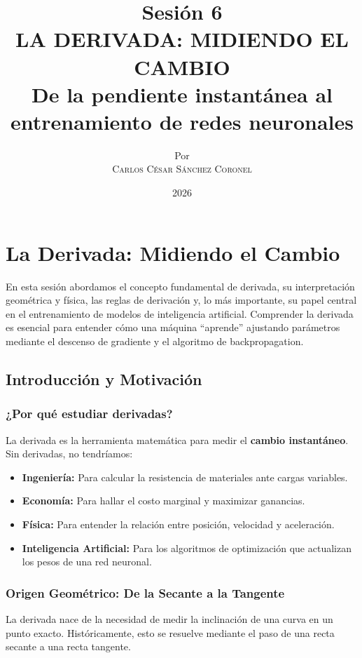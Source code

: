 \documentclass[12pt,a4paper,openany,oneside]{book}
\title{
    \textbf{Sesión 6} \\ 
    \Huge \textbf{LA DERIVADA: MIDIENDO EL CAMBIO} \\
    \large De la pendiente instantánea al entrenamiento de redes neuronales \\

}
\author{
    \small Por \\ \vspace{0.2cm}
    \Large \textsc{Carlos César Sánchez Coronel}
}
\date{2026}
\begin{document}
\maketitle
\tableofcontents
{}

\chapter{La Derivada: Midiendo el Cambio}

En esta sesión abordamos el concepto fundamental de derivada, su interpretación geométrica y física, las reglas de derivación y, lo más importante, su papel central en el entrenamiento de modelos de inteligencia artificial. Comprender la derivada es esencial para entender cómo una máquina ``aprende'' ajustando parámetros mediante el descenso de gradiente y el algoritmo de backpropagation.

\section{Introducción y Motivación}

\subsection{¿Por qué estudiar derivadas?}
La derivada es la herramienta matemática para medir el \textbf{cambio instantáneo}. Sin derivadas, no tendríamos:
\begin{itemize}
    \item \textbf{Ingeniería:} Para calcular la resistencia de materiales ante cargas variables.
    \item \textbf{Economía:} Para hallar el costo marginal y maximizar ganancias.
    \item \textbf{Física:} Para entender la relación entre posición, velocidad y aceleración.
    \item \textbf{Inteligencia Artificial:} Para los algoritmos de optimización que actualizan los pesos de una red neuronal.
\end{itemize}

\subsection{Origen Geométrico: De la Secante a la Tangente}
La derivada nace de la necesidad de medir la inclinación de una curva en un punto exacto. Históricamente, esto se resuelve mediante el paso de una recta secante a una recta tangente.
\end{document}
